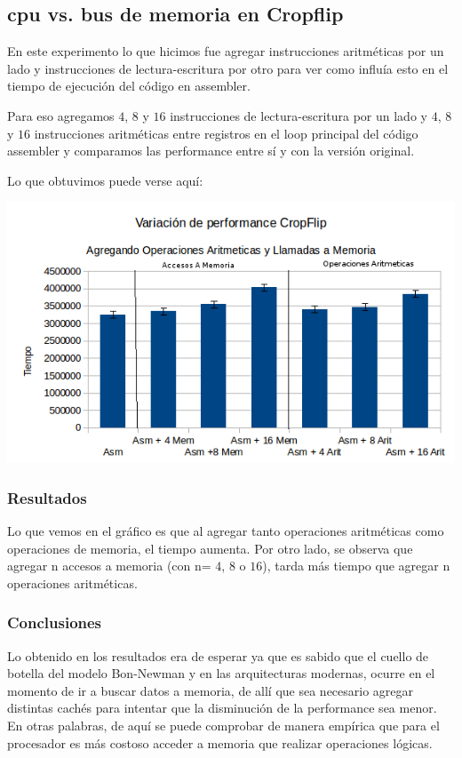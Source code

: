 \documentclass[a4paper]{article}
\begin{document}
\newpage

\subsection{cpu vs. bus de memoria en Cropflip}

En este experimento lo que hicimos fue agregar instrucciones aritméticas por un lado y instrucciones de lectura-escritura por otro para ver como influía esto en el tiempo de ejecución del código en assembler.

Para eso agregamos $4$, $8$ y $16$ instrucciones de lectura-escritura por un lado y $4$, $8$ y $16$ instrucciones aritméticas entre registros en el loop principal del código assembler y comparamos las performance entre sí y con la versión original.

Lo que obtuvimos puede verse aquí:

  \begin{center}
  \includegraphics[scale=0.66]{Graficos1.5/crop/per.png}
  \end{center}


\subsubsection{Resultados}
Lo que vemos en el gráfico es que al agregar tanto operaciones aritméticas como operaciones de memoria, el tiempo aumenta. Por otro lado, se observa que agregar n accesos a memoria (con n= $4$, $8$ o $16$), tarda más tiempo que agregar n operaciones aritméticas.

\subsubsection{Conclusiones}

Lo obtenido en los resultados era de esperar ya que es sabido que el cuello de botella del modelo Bon-Newman y en las arquitecturas modernas, ocurre en el momento de ir a buscar datos a memoria, de allí que sea necesario agregar distintas cachés para intentar que la disminución de la performance sea menor. En otras palabras, de aquí se puede comprobar de manera empírica que para el procesador es más costoso acceder a memoria que realizar operaciones lógicas. 
\end{document}
